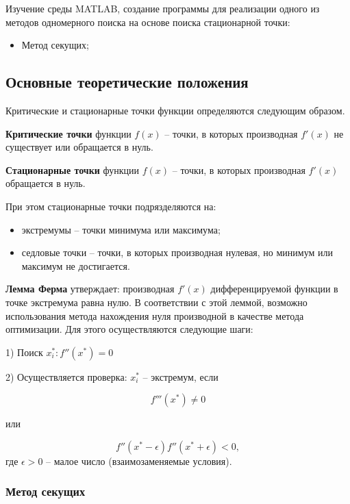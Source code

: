 \documentclass[a4paper,12pt]{article}
\begin{document}
Изучение среды MATLAB, создание программы для реализации одного из методов одномерного поиска на основе поиска стационарной точки: 

\begin{itemize}
	\item Метод секущих;
\end{itemize}


\subsection*{Основные теоретические положения}

Критические и стационарные точки функции определяются следующим образом.

\textbf{Критические точки} функции $f(x)$ -- точки, в которых производная $f'(x)$ не существует или обращается в нуль.

\textbf{Стационарные точки} функции $f(x)$ -- точки, в которых производная $f'(x)$ обращается в нуль.

При этом стационарные точки подрязделяются на:

\begin{itemize}
	\item экстремумы -- точки минимума или максимума;
	\item седловые точки -- точки, в которых производная нулевая, но минимум или максимум не достигается.
\end{itemize}


\textbf{Лемма Ферма} утверждает: производная $f'(x)$ дифференцируемой функции в точке экстремума равна нулю.
В соответствии с этой леммой, возможно использования метода нахождения нуля производной в качестве метода оптимизации. Для этого осуществляются следующие шаги:

1) Поиск ${x_i^*}: f''(x^*) = 0$

2) Осуществляется проверка: $x_i^*$ -- экстремум, если  

\begin{equation}
f'''(x^*) \neq 0
\label{lf1}
\end{equation}

 или 
 
 \begin{equation}
  f''(x^* - \epsilon)f''(x^* + \epsilon) < 0, 
  \label{lf2}
 \end{equation}
где $\epsilon > 0$ -- малое число (взаимозаменяемые условия).


\subsubsection*{Метод секущих}
\end{document}
